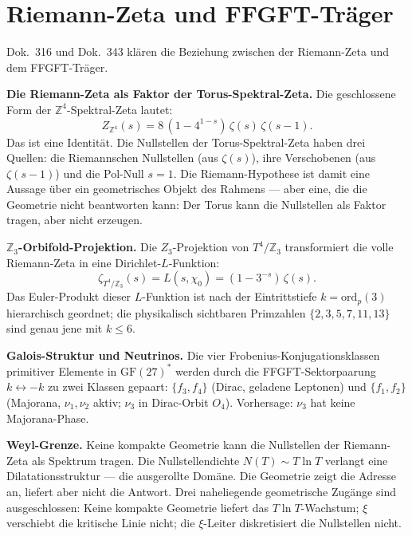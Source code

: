 \section{Riemann-Zeta und FFGFT-Träger}

Dok.~316 und Dok.~343 klären die Beziehung zwischen der Riemann-Zeta
und dem FFGFT-Träger.

\textbf{Die Riemann-Zeta als Faktor der Torus-Spektral-Zeta.}
Die geschlossene Form der $\mathbb{Z}^4$-Spektral-Zeta lautet:
\begin{equation}
  Z_{\mathbb{Z}^4}(s) = 8\,(1-4^{1-s})\,\zeta(s)\,\zeta(s-1).
\end{equation}
Das ist eine Identität. Die Nullstellen der Torus-Spektral-Zeta haben
drei Quellen: die Riemannschen Nullstellen (aus $\zeta(s)$), ihre
Verschobenen (aus $\zeta(s-1)$) und die Pol-Null $s = 1$. Die
Riemann-Hypothese ist damit eine Aussage über ein geometrisches Objekt
des Rahmens --- aber eine, die die Geometrie nicht beantworten kann:
Der Torus kann die Nullstellen als Faktor tragen, aber nicht erzeugen.

\textbf{$\mathbb{Z}_3$-Orbifold-Projektion.} Die
$Z_3$-Projektion von $T^4/\mathbb{Z}_3$ transformiert die volle
Riemann-Zeta in eine Dirichlet-$L$-Funktion:
\begin{equation}
  \zeta_{T^4/\mathbb{Z}_3}(s) = L(s,\chi_0) = (1-3^{-s})\,\zeta(s).
\end{equation}
Das Euler-Produkt dieser $L$-Funktion ist nach der Eintrittstiefe
$k = \mathrm{ord}_p(3)$ hierarchisch geordnet; die physikalisch
sichtbaren Primzahlen $\{2,3,5,7,11,13\}$ sind genau jene mit $k\le6$.

\textbf{Galois-Struktur und Neutrinos.} Die vier
Frobenius-Konjugationsklassen primitiver Elemente in $\mathrm{GF}(27)^*$
werden durch die FFGFT-Sektorpaarung $k\leftrightarrow-k$ zu zwei Klassen
gepaart: $\{f_3,f_4\}$ (Dirac, geladene Leptonen) und $\{f_1,f_2\}$
(Majorana, $\nu_1,\nu_2$ aktiv; $\nu_3$ in Dirac-Orbit $O_4$). Vorhersage:
$\nu_3$ hat keine Majorana-Phase.

\textbf{Weyl-Grenze.} Keine kompakte Geometrie kann die
Nullstellen der Riemann-Zeta als Spektrum tragen. Die Nullstellendichte
$N(T)\sim T\ln T$ verlangt eine Dilatationsstruktur --- die ausgerollte
Domäne. Die Geometrie zeigt die Adresse an, liefert aber nicht die Antwort.
Drei naheliegende geometrische Zugänge sind ausgeschlossen: Keine
kompakte Geometrie liefert das $T\ln T$-Wachstum; $\xi$ verschiebt die
kritische Linie nicht; die $\xi$-Leiter diskretisiert die Nullstellen nicht.

